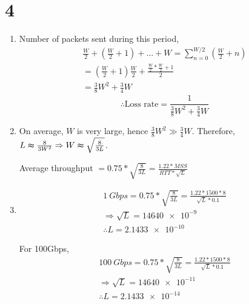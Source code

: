 \section*{4}
\begin{enumerate}
    \item Number of packets sent during this period,
    \begin{equation*}
        \begin{split}
            \frac{W}{2}+(\frac{W}{2} + 1)+...+W=\sum_{n=0}^{W/2}(\frac{W}{2} + n)\\
            = (\frac{W}{2} + 1)\frac{W}{2} + \frac{\frac{W}{2}*\frac{W}{2} + 1}{2}\\
            = \frac{3}{8}W^2 + \frac{3}{4}W
        \end{split}
    \end{equation*}
    $$\therefore \text{Loss rate} = \frac{1}{\frac{3}{8}W^2 + \frac{3}{4}W}$$
    
    \item On average, $W$ is very large, hence $\frac{3}{8}W^2 \gg \frac{3}{4}W$. Therefore, $L \thickapprox \frac{8}{3W^2} \Rightarrow W \thickapprox \sqrt{\frac{8}{3L}}$.
    
    Average throughput $= 0.75*\sqrt{\frac{8}{3L}} = \frac{1.22*MSS}{RTT*\sqrt{L}}$
    
    \item \begin{equation*}
            \begin{split}
                \SI{1}{Gbps} = 0.75*\sqrt{\frac{8}{3L}} = \frac{1.22*1500*8}{\sqrt{L}*0.1}\\
                \Rightarrow \sqrt{L} = \num{14640e-9}\\
                \therefore L = \num{2.1433e-10}
            \end{split}
        \end{equation*}
        
        For 100Gbps, 
        \begin{equation*}
            \begin{split}
                \SI{100}{Gbps} = 0.75*\sqrt{\frac{8}{3L}} = \frac{1.22*1500*8}{\sqrt{L}*0.1}\\
                \Rightarrow \sqrt{L} = \num{14640e-11}\\
                \therefore L = \num{2.1433e-14}
            \end{split}
        \end{equation*}
\end{enumerate}

